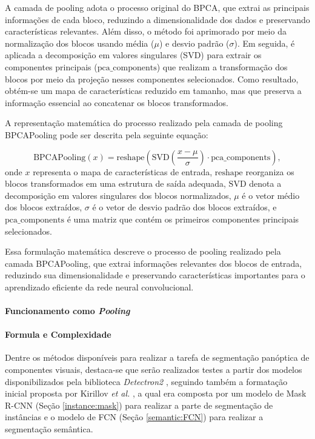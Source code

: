 A camada de pooling adota o processo original do BPCA, que extrai as principais informações de cada bloco, reduzindo a dimensionalidade dos dados e preservando características relevantes. Além disso, o método foi aprimorado por meio da normalização dos blocos usando média ($\mu$) e desvio padrão ($\sigma$). Em seguida, é aplicada a decomposição em valores singulares (SVD) para extrair os componentes principais ($\text{{pca\_components}}$) que realizam a transformação dos blocos por meio da projeção nesses componentes selecionados. Como resultado, obtém-se um mapa de características reduzido em tamanho, mas que preserva a informação essencial ao concatenar os blocos transformados.

A representação matemática do processo realizado pela camada de pooling BPCAPooling pode ser descrita pela seguinte equação:

\[
\text{{BPCAPooling}}(x) = \text{{reshape}}\left(\text{{SVD}}\left(\frac{{x - \mu}}{{\sigma}}\right) \cdot \text{{pca\_components}}\right),
\]
onde $x$ representa o mapa de características de entrada, $\text{{reshape}}$ reorganiza os blocos transformados em uma estrutura de saída adequada, $\text{{SVD}}$ denota a decomposição em valores singulares dos blocos normalizados, $\mu$ é o vetor médio dos blocos extraídos, $\sigma$ é o vetor de desvio padrão dos blocos extraídos, e $\text{{pca\_components}}$ é uma matriz que contém os primeiros componentes principais selecionados.

Essa formulação matemática descreve o processo de pooling realizado pela camada BPCAPooling, que extrai informações relevantes dos blocos de entrada, reduzindo sua dimensionalidade e preservando características importantes para o aprendizado eficiente da rede neural convolucional.

\paragraph{Funcionamento como \textit{Pooling}}

\paragraph{Formula e Complexidade}
Dentre os métodos disponíveis para realizar a tarefa de segmentação panóptica de componentes visuais, destaca-se que serão realizados testes a partir dos modelos disponibilizados pela biblioteca \textit{Detectron2} \cite{detectron2}, seguindo também a formatação inicial proposta por Kirillov \textit{et al.} \cite{Kirillov2019a}, a qual era composta por um modelo de Mask R-CNN (Seção \ref{instance:mask}) para realizar a parte de segmentação de instâncias e o modelo de FCN (Seção \ref{semantic:FCN}) para realizar a segmentação semântica.


